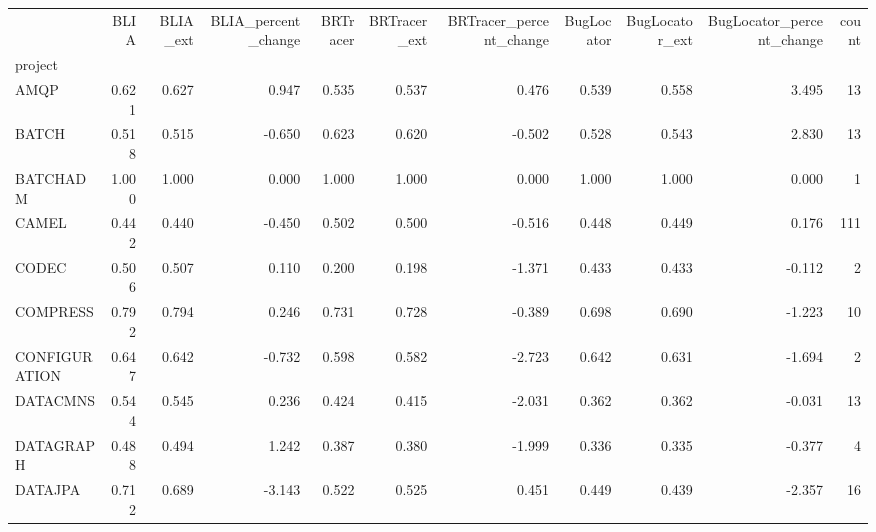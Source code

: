 \begin{tabular}{lrrrrrrrrrr}
\toprule
{} &  BLIA &  BLIA\_ext &  BLIA\_percent\_change &  BRTracer &  BRTracer\_ext &  BRTracer\_percent\_change &  BugLocator &  BugLocator\_ext &  BugLocator\_percent\_change &  count \\
project       &       &           &                      &           &               &                          &             &                 &                            &        \\
\midrule
AMQP          & 0.621 &     0.627 &                0.947 &     0.535 &         0.537 &                    0.476 &       0.539 &           0.558 &                      3.495 &     13 \\
BATCH         & 0.518 &     0.515 &               -0.650 &     0.623 &         0.620 &                   -0.502 &       0.528 &           0.543 &                      2.830 &     13 \\
BATCHADM      & 1.000 &     1.000 &                0.000 &     1.000 &         1.000 &                    0.000 &       1.000 &           1.000 &                      0.000 &      1 \\
CAMEL         & 0.442 &     0.440 &               -0.450 &     0.502 &         0.500 &                   -0.516 &       0.448 &           0.449 &                      0.176 &    111 \\
CODEC         & 0.506 &     0.507 &                0.110 &     0.200 &         0.198 &                   -1.371 &       0.433 &           0.433 &                     -0.112 &      2 \\
COMPRESS      & 0.792 &     0.794 &                0.246 &     0.731 &         0.728 &                   -0.389 &       0.698 &           0.690 &                     -1.223 &     10 \\
CONFIGURATION & 0.647 &     0.642 &               -0.732 &     0.598 &         0.582 &                   -2.723 &       0.642 &           0.631 &                     -1.694 &      2 \\
DATACMNS      & 0.544 &     0.545 &                0.236 &     0.424 &         0.415 &                   -2.031 &       0.362 &           0.362 &                     -0.031 &     13 \\
DATAGRAPH     & 0.488 &     0.494 &                1.242 &     0.387 &         0.380 &                   -1.999 &       0.336 &           0.335 &                     -0.377 &      4 \\
DATAJPA       & 0.712 &     0.689 &               -3.143 &     0.522 &         0.525 &                    0.451 &       0.449 &           0.439 &                     -2.357 &     16 \\

\end{tabular}
